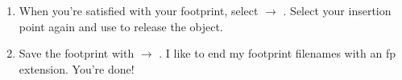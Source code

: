 \begin{enumerate}
\item When you're satisfied with your footprint, select
   $\rightarrow$ .
  Select your insertion point again and use  to release the
  object.
\item Save the footprint with  $\rightarrow$
  .  I like to end my footprint
  filenames with an fp extension.  You're done!
\end{enumerate}

